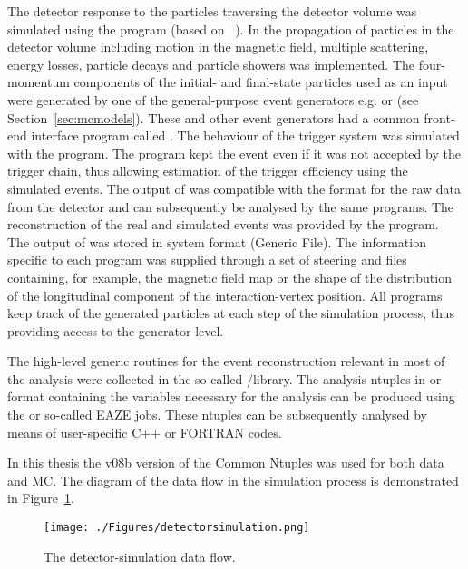 The detector response to the particles traversing the detector volume was simulated using the \mozart program (based on ~\cite{tech:cern-dd-ee-84-1}). In \mozart the propagation of particles in the detector volume including motion in the magnetic field, multiple scattering, energy losses, particle decays and particle showers was implemented. The four-momentum components of the initial- and final-state particles used as an input were generated by one of the general-purpose event generators e.g. \lepto or \ariadne (see Section~\ref{sec:mcmodels}). These and other event generators had a common front-end interface program called \amadeus. The behaviour of the trigger system was simulated with the \zgana program. The \zgana program kept the event even if it was not accepted by the trigger chain, thus allowing estimation of the trigger efficiency using the simulated events. The output of \zgana was compatible with the format for the raw data from the detector and can subsequently be analysed by the same programs. The reconstruction of the real and simulated events was provided by the \zephyr program. The output of \zephyr was stored in \adamo system format \gaf (Generic \adamo File). The information specific to each program was supplied through a set of steering and \gaf files containing, for example, the magnetic field map or the shape of the distribution of the longitudinal component of the interaction-vertex position. All programs keep track of the generated particles at each step of the simulation process, thus providing access to the generator level.

The high-level generic routines for the event reconstruction relevant in most of the analysis were collected in the so-called \orange/\PHANTOM library. The analysis ntuples in \paw or \rootpaw format containing the variables necessary for the analysis can be produced using the \orange or so-called EAZE jobs. These ntuples can be subsequently analysed by means of user-specific C++ or FORTRAN codes. 

In this thesis the v08b version of the Common Ntuples was used for both data and MC. The diagram of the data flow in the simulation process is demonstrated in Figure~\ref{fig:detectorsimulation}.

\begin{figure}[p]
	\centering
		\texttt{[image: ./Figures/detectorsimulation.png]}
	\caption{The \zeus detector-simulation data flow.}
	\label{fig:detectorsimulation}
\end{figure}
